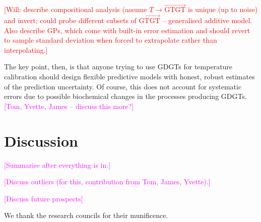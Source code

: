 \documentclass[rmp,aps,twocolumn]{revtex4-1}
\newcommand{\todo}[1]{\textcolor{red}{#1}}
\newcommand{\ilya}[1]{\textcolor{magenta}{#1}}
\begin{document}
\todo{[Will: describe compositional analysis (assume $T \to \vec{\mathrm{GTGT}}$ is unique (up to noise) and invert; could probe different subsets of $\vec{\mathrm{GTGT}}$ -- generalised additive model.  Also describe GPs, which come with built-in error estimation and should revert to sample standard deviation when forced to extrapolate rather than interpolating.]}

The key point, then, is that anyone trying to use GDGTs for temperature calibration should design flexible predictive models with honest, robust estimates of the prediction uncertainty.  Of course, this does not account for systematic errors due to possible biochemical changes in the processes producing GDGTs. \ilya{[Tom, Yvette, James -- discuss this more?]}

\section{Discussion}\label{sec:discussion}

\ilya{[Summarise after everything is in.]}

\ilya{[Discuss outliers (for this, contribution from Tom, James, Yvette).]}

\ilya{[Discuss future prospects]}


\begin{acknowledgements}
We thank the research councils for their munificence.

\end{acknowledgements}



\end{document}
